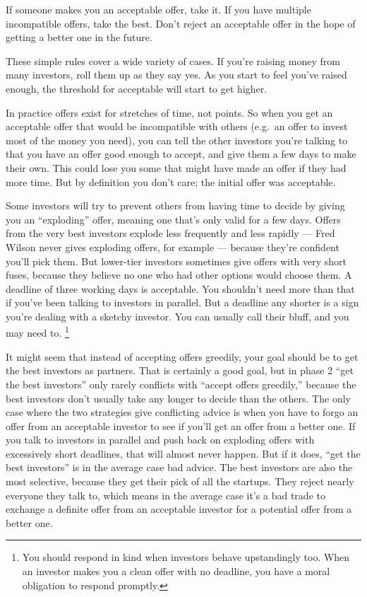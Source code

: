 If someone makes you an acceptable offer, take it. If you have multiple
incompatible offers, take the best. Don't reject an acceptable offer in
the hope of getting a better one in the future.

These simple rules cover a wide variety of cases. If you're raising
money from many investors, roll them up as they say yes. As you start to
feel you've raised enough, the threshold for acceptable will start to
get higher.

In practice offers exist for stretches of time, not points. So when you
get an acceptable offer that would be incompatible with others (e.g.~an
offer to invest most of the money you need), you can tell the other
investors you're talking to that you have an offer good enough to
accept, and give them a few days to make their own. This could lose you
some that might have made an offer if they had more time. But by
definition you don't care; the initial offer was acceptable.

Some investors will try to prevent others from having time to decide by
giving you an ``exploding'' offer, meaning one that's only valid for a
few days. Offers from the very best investors explode less frequently
and less rapidly --- Fred Wilson never gives exploding offers, for
example --- because they're confident you'll pick them. But lower-tier
investors sometimes give offers with very short fuses, because they
believe no one who had other options would choose them. A deadline of
three working days is acceptable. You shouldn't need more than that if
you've been talking to investors in parallel. But a deadline any shorter
is a sign you're dealing with a sketchy investor. You can usually call
their bluff, and you may need to. \footnote{You should respond in kind when investors behave upstandingly
too. When an investor makes you a clean offer with no deadline, you have
a moral obligation to respond promptly.}

It might seem that instead of accepting offers greedily, your goal
should be to get the best investors as partners. That is certainly a
good goal, but in phase 2 ``get the best investors'' only rarely
conflicts with ``accept offers greedily,'' because the best investors
don't usually take any longer to decide than the others. The only case
where the two strategies give conflicting advice is when you have to
forgo an offer from an acceptable investor to see if you'll get an offer
from a better one. If you talk to investors in parallel and push back on
exploding offers with excessively short deadlines, that will almost
never happen. But if it does, ``get the best investors'' is in the
average case bad advice. The best investors are also the most selective,
because they get their pick of all the startups. They reject nearly
everyone they talk to, which means in the average case it's a bad trade
to exchange a definite offer from an acceptable investor for a potential
offer from a better one.

